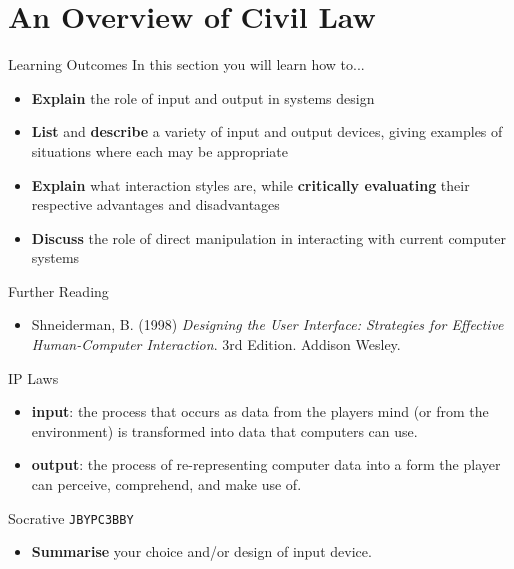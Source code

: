 \part{An Overview of Civil Law}
\frame{\partpage}

\begin{frame}{Learning Outcomes}
	In this section you will learn how to...
	
	\begin{itemize}
		\item \textbf{Explain} the role of input and output in systems design
		\item \textbf{List} and \textbf{describe} a variety of input and output devices, giving examples of situations where each may be appropriate
		\item \textbf{Explain} what interaction styles are, while \textbf{critically evaluating} their respective advantages and disadvantages
		\item \textbf{Discuss} the role of direct manipulation in interacting with current computer systems
	\end{itemize}
\end{frame}

\begin{frame}{Further Reading}
	\begin{itemize}
		\item Shneiderman, B. (1998) \textit{Designing the User Interface: Strategies for Effective Human-Computer Interaction}. 3rd Edition. Addison Wesley.
	\end{itemize}
\end{frame}

\begin{frame}{IP Laws}
	\begin{itemize}
		\item \textbf{input}: the process that occurs as data from the players mind (or from the environment) is transformed into data that computers can use.
		\item \textbf{output}: the process of re-representing computer data into a form the player can perceive, comprehend, and make use of.
	\end{itemize}
\end{frame}

\begin{frame}[fragile]{Socrative \texttt{JBYPC3BBY}}
	\begin{itemize}
		\item \textbf{Summarise} your choice and/or design of input device.
	\end{itemize}
\end{frame}
